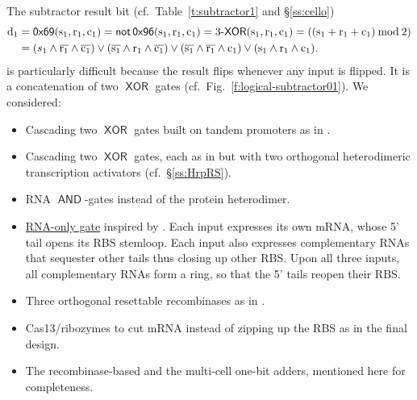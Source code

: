 \documentclass[12pt,notitlepage]{article}
\let\cite\citep
\newcommand{\NOT}{\ensuremath{\mathop{\mathsf{not}}}\xspace}
\newcommand{\AND}{\ensuremath{\mathop{\mathsf{AND}}}\xspace}
\newcommand{\XOR}{\ensuremath{\mathop{\mathsf{XOR}}}\xspace}
\newcommand{\with}{\text{$\,{:}\,$}}
\begin{document}
The subtractor result bit
(cf.~Table~\ref{t:subtractor1} and \S\ref{ss:cello})
\begin{subequations}
	\begin{align} 
		\label{e:3xor}
		\ce{d_1} 
		& = 
		\mathop{\mathsf{0x69}}
		(\ce{s_1}, \ce{r_1}, \ce{c_1})
		=
		\NOT
		\mathop{\mathsf{0x96}}
		(\ce{s_1}, \ce{r_1}, \ce{c_1})
		=
		\text{3-\XOR}
		(\ce{s_1}, \ce{r_1}, \ce{c_1})
		=
		((\ce{s_1} + \ce{r_1} + \ce{c_1}) \mathbin{\mathrm{mod}} 2)
		\\
		\label{e:3xor-dnf}
		& =
		(s_1 \wedge \ce{\overline{r_1}} \wedge \ce{\overline{c_1}})
		\vee
		(\ce{\overline{s_1}} \wedge \ce{r_1} \wedge \ce{\overline{c_1}})
		\vee
		(\ce{\overline{s_1}} \wedge \ce{\overline{r_1}} \wedge \ce{c_1})
		\vee
		(\ce{s_1} \wedge \ce{r_1} \wedge \ce{c_1})
		.
	\end{align}
\end{subequations}
is particularly difficult
because the result flips 
whenever any input is flipped.
%
%
It is a concatenation
of two \XOR gates (cf.~Fig.~\ref{f:logical-subtractor01}).
%
%
%
We considered:
%
\begin{itemize}
\item
	Cascading 
	two \XOR gates
	built on tandem promoters as in
	\cite[\href{https://science.sciencemag.org/content/sci/352/6281/aac7341/F4.large.jpg}{Fig.~3}]{NielsenETAL2016}.
\item
	Cascading
	two \XOR gates, 
	each as in 
	\cite[\href{https://bmcbiol.biomedcentral.com/articles/10.1186/s12915-015-0146-0/figures/5}{Fig.~5}]{Wong2015}
	but
	with two orthogonal heterodimeric transcription activators
	(cf.~\S\ref{ss:HrpRS}).
\item
	RNA \AND-gates
	\cite[\href{https://www.nature.com/articles/nature23271/figures/2}{Fig.~2e}]{GreenETAL2017}
	instead of the protein heterodimer.
\item
	\href{https://bit.ly/wsgxfDv}{RNA-only gate}
	inspired by
	\cite[\href{https://www.nature.com/articles/nature23271/figures/2}{Fig.~2e}]{GreenETAL2017}.
	Each input expresses its own mRNA,
	whose
	5' tail opens its RBS stemloop.
	Each input also expresses
	complementary RNAs
	that
	sequester other tails 
	thus closing up other RBS.
	Upon all three inputs,
	all complementary RNAs 
	form a ring,
	so that the 5' tails reopen their RBS.
\item
	Three orthogonal resettable recombinases
	as in 
	\cite[\href{https://www.nature.com/articles/s41598-017-07386-3/figures/2}{Fig.~2g}]{ChiuJiang2017}.
\item
    Cas13/ribozymes
    to cut mRNA
    instead of zipping up the RBS as
    in the final design.
\item
    The recombinase-based
    \citep{WeinbergETAL2017}
    and
    the multi-cell
    \citep{AuslaenderETAL2017}
    one-bit adders,
    mentioned here for completeness.
\end{itemize}
\end{document}
